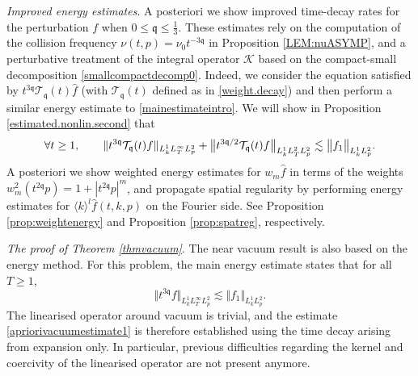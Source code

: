 \documentclass[reqno]{amsart}
\newcommand{\pv}{p}
\def\norm#1{\big\Vert#1\big\Vert}
\newcommand{\qq}{\mathfrak{q}}
\newcommand{\tTq}{t^{3\qq}}
\newcommand{\tw}{\mathcal{T}_{\qq}}
\theoremstyle{definition}
\numberwithin{equation}{section}
\numberwithin{theorem}{section}
\begin{document}
\textit{Improved energy estimates}. A posteriori we show improved time-decay rates for the perturbation \(f\) when \(0\leq \mathfrak{q}\leq \frac{1}{3}\). These estimates rely on the computation of the collision frequency \(\nu (t,p)=\nu_0t^{-3\mathfrak{q}}\) in Proposition \ref{LEM:nuASYMP}, and a perturbative treatment of the integral operator \(\mathcal{K}\) based on the compact-small decomposition \eqref{smallcompactdecomp0}. Indeed, we consider the equation satisfied by \(t^{3\qq}\mathcal{T}_{\qq}(t)\hat{f}\) (with \(\tw(t)\) defined as in \eqref{weight.decay}) and then perform a similar energy estimate to \eqref{mainestimateintro}. We will show in Proposition \ref{estimated.nonlin.second} that  
\begin{align}\notag
       \forall t\geq 1,\qquad      {\Vert{\tTq \tw(t) f}\Vert_{L^1_kL^\infty_TL^2_{\pv}}}
+
{\norm{t^{3\qq/2} \tw(t) f}_{L^1_kL^2_TL^2_{\pv}}}
\lesssim 
\norm{ {f}_1}_{L^1_kL^2_{\pv}}.
\end{align} 
A posteriori we show weighted energy estimates for \( w_m \hat{f}\) in terms of the weights \(w_m^2(t^{2\qq}p)=1+|t^{2\qq}p|^m\), and propagate spatial regularity by performing energy estimates for \(\langle k\rangle^{l} \hat{f}(t,k,p)\) on the Fourier side. See Proposition \ref{prop:weightenergy} and Proposition \ref{prop:spatreg}, respectively.



\textit{The proof of Theorem \ref{thmvacuum}}. The near vacuum result is also based on the energy method. For this problem, the main energy estimate states that for all \(T\geq 1\),
\begin{equation}\label{apriorivacuumestimate1}
{\norm{t^{3\qq} f}_{L^1_kL^\infty_TL^2_{\pv}}}
\lesssim 
\norm{f_1}_{L^1_kL^2_{\pv}}.    
\end{equation}
The linearised operator around vacuum is trivial, and the estimate \eqref{apriorivacuumestimate1} is therefore established using the time decay arising from expansion only. In particular, previous difficulties regarding the kernel and coercivity of the linearised operator are not present anymore. 
\end{document}
